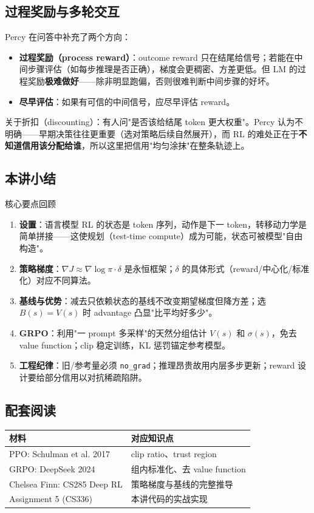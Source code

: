 \documentclass[a4paper]{article}
\begin{document}
\subsection{过程奖励与多轮交互}

Percy 在问答中补充了两个方向：

\begin{itemize}
\item \textbf{过程奖励（process reward）}：outcome reward 只在结尾给信号；若能在中间步骤评估（如每步推理是否正确），梯度会更稠密、方差更低。但 LM 的过程奖励\textbf{极难做好}——除非明显跑偏，否则很难判断中间步骤的好坏。
\item \textbf{尽早评估}：如果有可信的中间信号，应尽早评估 reward。
\end{itemize}

关于折扣（discounting）：有人问"是否该给结尾 token 更大权重"。Percy 认为不明确——早期决策往往更重要（选对策略后续自然展开），而 RL 的难处正在于\textbf{不知道信用该分配给谁}，所以这里把信用"均匀涂抹"在整条轨迹上。

\subsection{本讲小结}

\begin{importantbox}{核心要点回顾}
\begin{enumerate}
\item \textbf{设置}：语言模型 RL 的状态是 token 序列，动作是下一 token，转移动力学是简单拼接——这使规划（test-time compute）成为可能，状态可被模型"自由构造"。
\item \textbf{策略梯度}：$\nabla J \approx \nabla\log\pi \cdot \delta$ 是永恒框架；$\delta$ 的具体形式（reward/中心化/标准化）对应不同算法。
\item \textbf{基线与优势}：减去只依赖状态的基线不改变期望梯度但降方差；选 $B(s)=V(s)$ 时 advantage 凸显"比平均好多少"。
\item \textbf{GRPO}：利用"一 prompt 多采样"的天然分组估计 $V(s)$ 和 $\sigma(s)$，免去 value function；clip 稳定训练，KL 惩罚锚定参考模型。
\item \textbf{工程纪律}：旧/参考量必须 \texttt{no\_grad}；推理昂贵故用内层多步更新；reward 设计要给部分信用以对抗稀疏陷阱。
\end{enumerate}
\end{importantbox}

\subsection{配套阅读}

\begin{tabular}{p{7cm}p{6cm}}
\toprule
\textbf{材料} & \textbf{对应知识点} \\
\midrule
PPO: Schulman et al. 2017 & clip ratio、trust region \\
GRPO: DeepSeek 2024 & 组内标准化、去 value function \\
Chelsea Finn: CS285 Deep RL & 策略梯度与基线的完整推导 \\
Assignment 5 (CS336) & 本讲代码的实战实现 \\
\bottomrule
\end{tabular}

\end{document}
